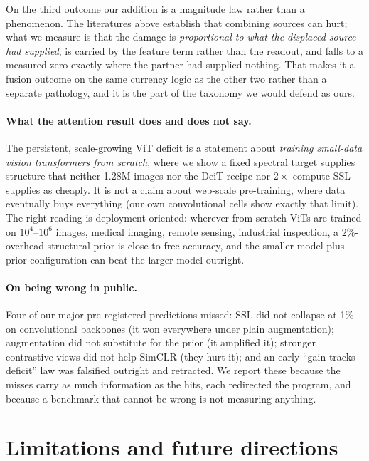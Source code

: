 On the third outcome our addition is a magnitude law rather than a
phenomenon. The literatures above establish that combining sources can hurt;
what we measure is that the damage is \emph{proportional to what the
displaced source had supplied}, is carried by the feature term rather than
the readout, and falls to a measured zero exactly where the partner had
supplied nothing. That makes it a fusion outcome on the same currency logic
as the other two rather than a separate pathology, and it is the part of
the taxonomy we would defend as ours.

\paragraph{What the attention result does and does not say.}
The persistent, scale-growing ViT deficit is a statement about
\emph{training small-data vision transformers from scratch}, where we
show a fixed spectral target supplies structure that neither 1.28M images
nor the DeiT recipe nor $2\times$-compute SSL supplies as cheaply. It is
not a claim about web-scale pre-training, where data eventually buys
everything (our own convolutional cells show exactly that limit). The
right reading is deployment-oriented: wherever from-scratch ViTs are
trained on $10^4$--$10^6$ images, medical imaging, remote sensing,
industrial inspection, a $2\%$-overhead structural prior is close to
free accuracy, and the smaller-model-plus-prior configuration can beat
the larger model outright.

\paragraph{On being wrong in public.}
Four of our major pre-registered predictions missed: SSL did not collapse
at 1\% on convolutional backbones (it won everywhere under plain
augmentation); augmentation did not substitute for the prior (it
amplified it); stronger contrastive views did not help SimCLR (they hurt
it); and an early ``gain tracks deficit'' law was falsified outright and
retracted. We report these because the misses carry as much information
as the hits, each redirected the program, and because a benchmark
that cannot be wrong is not measuring anything.

\section{Limitations and future directions}\label{sec:limits}

